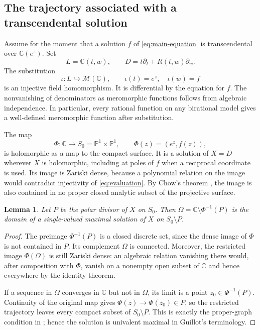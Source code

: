 \documentclass[11pt,reqno]{amsart}
\numberwithin{equation}{section}
\newtheorem{lemma}[theorem]{Lemma}
\theoremstyle{definition}
\theoremstyle{remark}
\newcommand{\C}{\mathbb C}
\newcommand{\PP}{\mathbb P}
\newcommand{\MM}{\mathcal M}
\begin{document}
\subsection{The trajectory associated with a transcendental solution}

Assume for the moment that a solution $f$ of
\eqref{eq:main-equation} is transcendental over $\C(e^z)$. Set
\begin{equation}
 L=\C(t,w),\qquad
 D=t\partial_t+R(t,w)\partial_w.
 \label{eq:ambient-derivation}
\end{equation}
The substitution
\begin{equation}
 \iota:L\hookrightarrow\MM(\C),\qquad
 \iota(t)=e^z,\quad \iota(w)=f
 \label{eq:evaluation}
\end{equation}
is an injective field homomorphism. It is differential by the equation
for $f$. The nonvanishing of denominators as meromorphic functions
follows from algebraic independence. In particular, every rational
function on any birational model gives a well-defined meromorphic
function after substitution.

The map
\[
 \Phi:\C\longrightarrow S_0=\PP^1\times\PP^1,
 \qquad \Phi(z)=(e^z,f(z)),
\]
is holomorphic as a map to the compact surface. It is a solution of
$X=D$ wherever $X$ is holomorphic, including at poles of $f$ when a
reciprocal coordinate is used. Its image is Zariski dense, because a
polynomial relation on the image would contradict injectivity of
\eqref{eq:evaluation}. By Chow's theorem
\cite[Appendix~B]{Hartshorne1977}, the image is also contained in no
proper closed analytic subset of the projective surface.

\begin{lemma}
\label{lem:maximal}
Let $P$ be the polar divisor of $X$ on $S_0$. Then
$\Omega=\C\setminus\Phi^{-1}(P)$ is the domain of a single-valued
maximal solution of $X$ on $S_0\setminus P$.
\end{lemma}

\begin{proof}
The preimage $\Phi^{-1}(P)$ is a closed discrete set, since the dense
image of $\Phi$ is not contained in $P$. Its complement $\Omega$ is
connected. Moreover, the restricted image $\Phi(\Omega)$ is still
Zariski dense: an algebraic relation vanishing there would, after
composition with $\Phi$, vanish on a nonempty open subset of $\C$ and
hence everywhere by the identity theorem.

If a sequence in $\Omega$ converges in $\C$ but not in $\Omega$, its
limit is a point $z_0\in\Phi^{-1}(P)$. Continuity of the original map
gives $\Phi(z)\to\Phi(z_0)\in P$, so the restricted trajectory leaves
every compact subset of $S_0\setminus P$. This is exactly the
proper-graph condition in \cite[Definition~5]{Guillot2019}; hence the
solution is univalent maximal in Guillot's terminology.
\end{proof}
\end{document}
